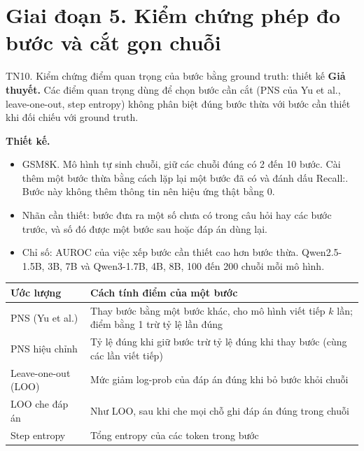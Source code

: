 \documentclass[aspectratio=169,t,10pt]{beamer}
\newcommand{\ex}[1]{{\ttfamily\footnotesize #1}}
\begin{document}
\section{Giai đoạn 5. Kiểm chứng phép đo bước và cắt gọn chuỗi}
\begin{frame}[shrink]{TN10. Kiểm chứng điểm quan trọng của bước bằng ground truth: thiết kế}
\small
\textbf{Giả thuyết.} Các điểm quan trọng dùng để chọn bước cần cắt (PNS của Yu et al., leave-one-out, step entropy) không phân biệt đúng bước thừa với bước cần thiết khi đối chiếu với ground truth.\par
\vspace{3pt}
\textbf{Thiết kế.}
\begin{itemize}
  \item GSM8K. Mô hình tự sinh chuỗi, giữ các chuỗi đúng có 2 đến 10 bước. Cài thêm một bước thừa bằng cách lặp lại một bước đã có và đánh dấu \ex{Recall:}. Bước này không thêm thông tin nên hiệu ứng thật bằng 0.
  \item Nhãn cần thiết: bước đưa ra một số chưa có trong câu hỏi hay các bước trước, và số đó được một bước sau hoặc đáp án dùng lại.
  \item Chỉ số: AUROC của việc xếp bước cần thiết cao hơn bước thừa. Qwen2.5-1.5B, 3B, 7B và Qwen3-1.7B, 4B, 8B, 100 đến 200 chuỗi mỗi mô hình.
\end{itemize}
\vspace{3pt}
\footnotesize
\renewcommand{\arraystretch}{1.25}
\begin{tabularx}{\textwidth}{@{}P{3.2cm}Y@{}}
\toprule
\textbf{Ước lượng} & \textbf{Cách tính điểm của một bước}\\
\midrule
PNS (Yu et al.) & Thay bước bằng một bước khác, cho mô hình viết tiếp $k$ lần; điểm bằng 1 trừ tỷ lệ lần đúng\\
PNS hiệu chỉnh & Tỷ lệ đúng khi giữ bước trừ tỷ lệ đúng khi thay bước (cùng các lần viết tiếp)\\
Leave-one-out (LOO) & Mức giảm log-prob của đáp án đúng khi bỏ bước khỏi chuỗi\\
LOO che đáp án & Như LOO, sau khi che mọi chỗ ghi đáp án đúng trong chuỗi\\
Step entropy & Tổng entropy của các token trong bước\\
\bottomrule
\end{tabularx}
\end{frame}
\end{document}
